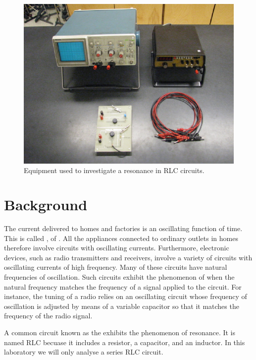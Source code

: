 \documentclass[12pt, a4paper, oneside, openright, titlepage]{book}
\begin{document}
\begin{figure}[H]
    \centering
    \includegraphics[scale = 0.8]{Images/Res1.PNG}
    \caption{Equipment used to investigate a resonance in RLC circuits.}
    \label{fig:Res1}
\end{figure}


\section{Background}


The current delivered to homes and factories is an oscillating function of time. This is called , of . All the appliances connected to ordinary outlets in homes therefore involve circuits with oscillating currents. Furthermore, electronic devices, such as radio transmitters and receivers, involve a variety of circuits with oscillating currents of high frequency. Many of these circuits have natural frequencies of oscillation. Such circuits exhibit the phenomenon of  when the natural frequency matches the frequency of a signal applied to the circuit. For instance, the tuning of a radio relies on an oscillating circuit whose frequency of oscillation is adjusted by means of a variable capacitor so that it matches the frequency of the radio signal.

\noindent A common circuit known as the  exhibits the phenomenon of resonance. It is named RLC becuase it includes a resistor, a capacitor, and an inductor. In this laboratory we will only analyse a series RLC circuit.
\end{document}
